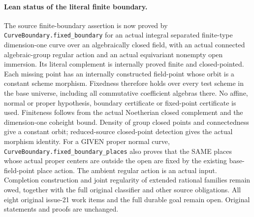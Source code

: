 \documentclass[11pt,oneside]{article}
\theoremstyle{definition}
\theoremstyle{remark}
\newcommand{\lean}[1]{\nolinkurl{#1}}
\begin{document}
\paragraph{Lean status of the literal finite boundary.}
The source finite-boundary assertion is now proved by \lean{CurveBoundary.fixed_boundary}
for an actual integral separated finite-type dimension-one curve over an algebraically
closed field, with an actual connected algebraic-group regular action and an actual
equivariant nonempty open immersion. Its literal complement is internally proved finite
and closed-pointed. Each missing point has an internally constructed field-point whose
orbit is a constant scheme morphism. Fixedness therefore holds over every test scheme
in the base universe, including all commutative coefficient algebras there. No affine,
normal or proper hypothesis, boundary certificate or fixed-point certificate is used.
Finiteness follows from the actual Noetherian closed complement and the dimension-one
coheight bound. Density of group closed points and connectedness give a constant orbit;
reduced-source closed-point detection gives the actual morphism identity. For a GIVEN
proper normal curve, \lean{CurveBoundary.fixed_boundary_places} also proves that the SAME
places whose actual proper centers are outside the open are fixed by the existing
base-field-point place action. The ambient regular action is an actual input. Completion
construction and joint regularity of extended rational families remain owed, together
with the full original classifier and other source obligations. All eight original
issue-21 work items and the full durable goal remain open. Original statements and proofs
are unchanged.
\end{document}
